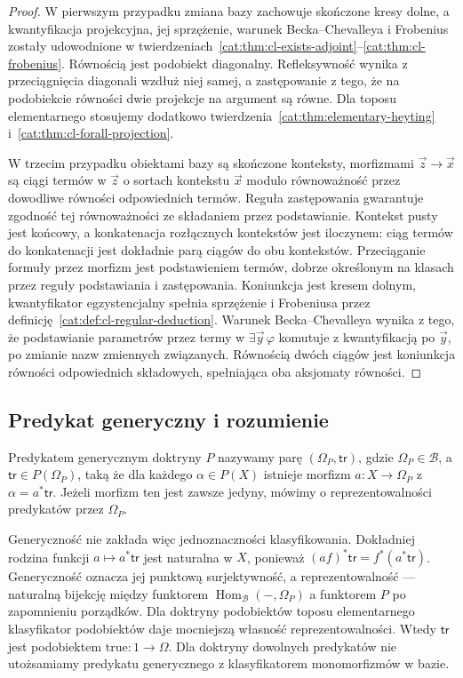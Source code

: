 \begin{proof}
W pierwszym przypadku zmiana bazy zachowuje skończone kresy dolne, a kwantyfikacja projekcyjna, jej sprzężenie, warunek Becka--Chevalleya i Frobenius zostały udowodnione w twierdzeniach~\ref{cat:thm:cl-exists-adjoint}--\ref{cat:thm:cl-frobenius}. Równością jest podobiekt diagonalny. Refleksywność wynika z przeciągnięcia diagonali wzdłuż niej samej, a zastępowanie z tego, że na podobiekcie równości dwie projekcje na argument są równe. Dla toposu elementarnego stosujemy dodatkowo twierdzenia~\ref{cat:thm:elementary-heyting} i~\ref{cat:thm:cl-forall-projection}.

W trzecim przypadku obiektami bazy są skończone konteksty, morfizmami $\vec z\to\vec x$ są ciągi termów w $\vec z$ o sortach kontekstu $\vec x$ modulo równoważność przez dowodliwe równości odpowiednich termów. Reguła zastępowania gwarantuje zgodność tej równoważności ze składaniem przez podstawianie. Kontekst pusty jest końcowy, a konkatenacja rozłącznych kontekstów jest iloczynem: ciąg termów do konkatenacji jest dokładnie parą ciągów do obu kontekstów. Przeciąganie formuły przez morfizm jest podstawieniem termów, dobrze określonym na klasach przez reguły podstawiania i zastępowania. Koniunkcja jest kresem dolnym, kwantyfikator egzystencjalny spełnia sprzężenie i Frobeniusa przez definicję~\ref{cat:def:cl-regular-deduction}. Warunek Becka--Chevalleya wynika z tego, że podstawianie parametrów przez termy w $\exists\vec y\,\varphi$ komutuje z kwantyfikacją po $\vec y$, po zmianie nazw zmiennych związanych. Równością dwóch ciągów jest koniunkcja równości odpowiednich składowych, spełniająca oba aksjomaty równości.
\end{proof}

\subsection{Predykat generyczny i rozumienie}

\begin{definicja}\label{cat:def:cl-generic-predicate}
Predykatem generycznym doktryny $P$ nazywamy parę $(\Omega_P,\mathsf{tr})$, gdzie $\Omega_P\in\mathcal B$, a $\mathsf{tr}\in P(\Omega_P)$, taką że dla każdego $\alpha\in P(X)$ istnieje morfizm $a:X\to\Omega_P$ z $\alpha=a^*\mathsf{tr}$. Jeżeli morfizm ten jest zawsze jedyny, mówimy o reprezentowalności predykatów przez $\Omega_P$.
\end{definicja}

Generyczność nie zakłada więc jednoznaczności klasyfikowania. Dokładniej rodzina funkcji $a\mapsto a^*\mathsf{tr}$ jest naturalna w $X$, ponieważ $(af)^*\mathsf{tr}=f^*(a^*\mathsf{tr})$. Generyczność oznacza jej punktową surjektywność, a reprezentowalność --- naturalną bijekcję między funktorem $\operatorname{Hom}_{\mathcal B}(-,\Omega_P)$ a funktorem $P$ po zapomnieniu porządków. Dla doktryny podobiektów toposu elementarnego klasyfikator podobiektów daje mocniejszą własność reprezentowalności. Wtedy $\mathsf{tr}$ jest podobiektem $\mathrm{true}:1\to\Omega$. Dla doktryny dowolnych predykatów nie utożsamiamy predykatu generycznego z klasyfikatorem monomorfizmów w bazie.

